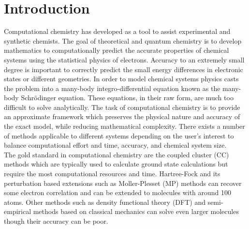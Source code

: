 
\section{Introduction}
Computational chemistry has developed as a tool to assist experimental and synthetic chemists.  The goal of theoretical and quantum chemistry is to develop mathematics to computationally predict the accurate properties of chemical systems using the statistical physics of electrons. Accuracy to an extremely small degree is important to correctly predict the small energy differences in electronic states or different geometries.\cite{schavitt 1977}  In order to model chemical systems physics casts the problem into a many-body integro-differential equation known as the many-body Schr{\"o}dinger equation.  These equations, in their raw form, are much too difficult to solve analytically.  The task of computational chemistry is to provide an approximate framework which preserves the physical nature and accuracy of the exact model, while reducing mathematical complexity.  There exists a number of methods applicable to different systems depending on the user's interest to balance computational effort and time, accuracy, and chemical system size.\\
The gold standard in computational chemistry are the coupled cluster (CC) methods which are typically used to calculate ground state calculations but require the most computational resources and time.  Hartree-Fock and its perturbation based extensions such as M{\/o}ller-Plesset (MP) methods can recover some electron correlation and can be extended to molecules with around 100 atoms.  Other methods such as density functional theory (DFT) and semi-empirical methods based on classical mechanics can solve even larger molecules though their accuracy can be poor.
